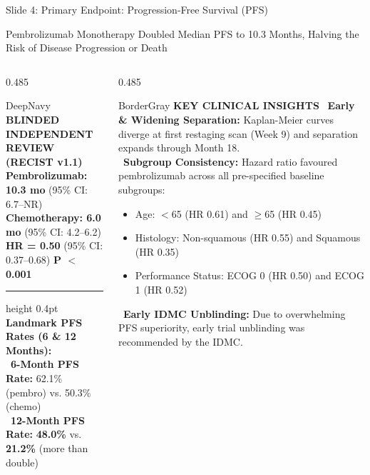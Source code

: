 \documentclass[aspectratio=169,10pt]{beamer}
\begin{document}
\begin{frame}{Slide 4: Primary Endpoint: Progression-Free Survival (PFS)}
\begin{actionbanner}
Pembrolizumab Monotherapy Doubled Median PFS to 10.3 Months, Halving the Risk of Disease Progression or Death
\end{actionbanner}

\vspace{2pt}

\begin{columns}[T]
  \begin{column}{0.485\textwidth}
    \begin{statcard}{DeepNavy}
      {\scriptsize\textbf{\color{DeepNavy}BLINDED INDEPENDENT REVIEW (RECIST v1.1)}}\\[3pt]
      \scriptsize
      \textbf{\color{MedTeal}Pembrolizumab: 10.3 mo} \tiny(95\% CI: 6.7--NR)\\
      \textbf{\color{AlertRed}Chemotherapy: 6.0 mo} \tiny(95\% CI: 4.2--6.2)\\[3pt]
      \normalsize\textbf{\color{DeepNavy}HR = 0.50} \scriptsize(95\% CI: 0.37--0.68) \quad \textbf{\color{SuccessGreen}P $<$ 0.001}\\[3pt]
      \hrule height 0.4pt\vskip 3pt
      \textbf{Landmark PFS Rates (6 \& 12 Months):}\\
      \textbullet\ \textbf{6-Month PFS Rate:} 62.1\% (pembro) vs. 50.3\% (chemo)\\
      \textbullet\ \textbf{12-Month PFS Rate:} \textbf{48.0\%} vs. \textbf{21.2\%} (more than double)
    \end{statcard}
  \end{column}

  \begin{column}{0.485\textwidth}
    \begin{statcard}{BorderGray}
      {\scriptsize\textbf{\color{DeepNavy}KEY CLINICAL INSIGHTS}}
      \vskip 3pt
      \tiny
      \textbullet\ \textbf{Early \& Widening Separation:} Kaplan-Meier curves diverge at first restaging scan (Week 9) and separation expands through Month 18.\\[3pt]
      \textbullet\ \textbf{Subgroup Consistency:} Hazard ratio favoured pembrolizumab across all pre-specified baseline subgroups:
      \begin{itemize}\tiny\setlength{\itemsep}{1pt}
        \item Age: $<$65 (HR 0.61) and $\ge$65 (HR 0.45)
        \item Histology: Non-squamous (HR 0.55) and Squamous (HR 0.35)
        \item Performance Status: ECOG 0 (HR 0.50) and ECOG 1 (HR 0.52)
      \end{itemize}
      \vskip 2pt
      \textbullet\ \textbf{Early IDMC Unblinding:} Due to overwhelming PFS superiority, early trial unblinding was recommended by the IDMC.
    \end{statcard}
  \end{column}
\end{columns}
\end{frame}
\end{document}
